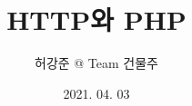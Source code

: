 \documentclass{beamer}
\title{HTTP와 PHP}
\author{허강준 @ Team 건물주}
\institute{충남대학교 정보보호동아리 ARGOS}
\date{2021. 04. 03}
\begin{document}
\frame{\titlepage}
\end{document}
